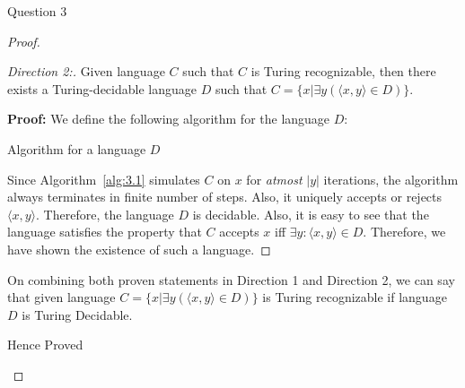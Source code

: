 \begin{solution}{Question 3}
\begin{proof}
      \begin{proof}[Direction 2:]
        Given language $C$ such that $C$ is Turing recognizable, then there exists a Turing-decidable language $D$ such that $C = \{ x | \exists y (\langle x,y \rangle \in D) \}$.\par
        \textbf{Proof:}
        We define the following algorithm for the language $D$:
        \begin{algorithm}[H]
          \caption{Algorithm for a language $D$}
          \label{alg:3.1}
          \begin{algorithmic}[1]
                
              \Else{}
              \EndIf{}
            \EndProcedure{}
          \end{algorithmic}
        \end{algorithm}
        Since Algorithm~\ref{alg:3.1} simulates $C$ on $x$ for \textit{atmost} $|y|$ iterations, the algorithm always terminates in finite number of steps. Also, it uniquely accepts or rejects $\langle x, y\rangle$. Therefore, the language $D$ is decidable. Also, it is easy to see that the language satisfies the property that $C$ accepts $x$ iff $\exists y: \langle x, y\rangle \in D$. Therefore, we have shown the existence of such a language.
      \end{proof}
      
      On combining both proven statements in Direction 1 and Direction 2, we can say that given language $C = \{ x | \exists y (\langle x,y \rangle \in D) \}$ is Turing recognizable if language $D$ is Turing Decidable.
      \begin{center}
          Hence Proved
      \end{center}
    \end{proof}
\end{solution}
